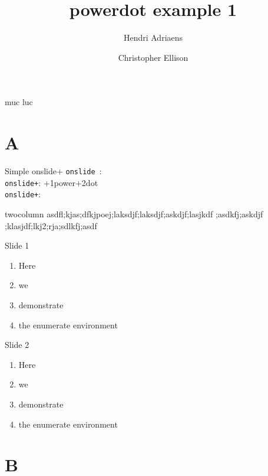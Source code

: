 \documentclass[a4paper,style=fyma]{powerdot}
\title{powerdot example 1}
\author{Hendri Adriaens \and Christopher Ellison}
\begin{document}
\maketitle

\begin{slide}{muc luc}
\tableofcontents
\end{slide}

\section{A}

\begin{slide}{Simple onslide+}
 \texttt{onslide }: \\
 \texttt{onslide+}: \onslide+{1}{power}\onslide+{2}{dot}\\
 \texttt{onslide+}: \\
\end{slide}

\begin{slide}{twocolumn}
%
	{asdfl;kjas;dfkjpoej;laksdjf;laksdjf;askdjf;lasjkdf}%
	{;asdkfj;askdjf ;klasjdf;lkj2;rja;sdlkfj;asdf}
\end{slide}

\begin{slide}{Slide 1}
  \begin{enumerate}[type=1]
    \item Here
      \item we
        \item demonstrate
          \item the enumerate environment
  \end{enumerate}
\end{slide}

\begin{slide}{Slide 2}
  \begin{enumerate}[type=0]
    \item<1-> Here
      \item<2-> we
        \item<3-> demonstrate
          \item<4-> the enumerate environment
  \end{enumerate}
\end{slide}

\section{B}
\end{document}
